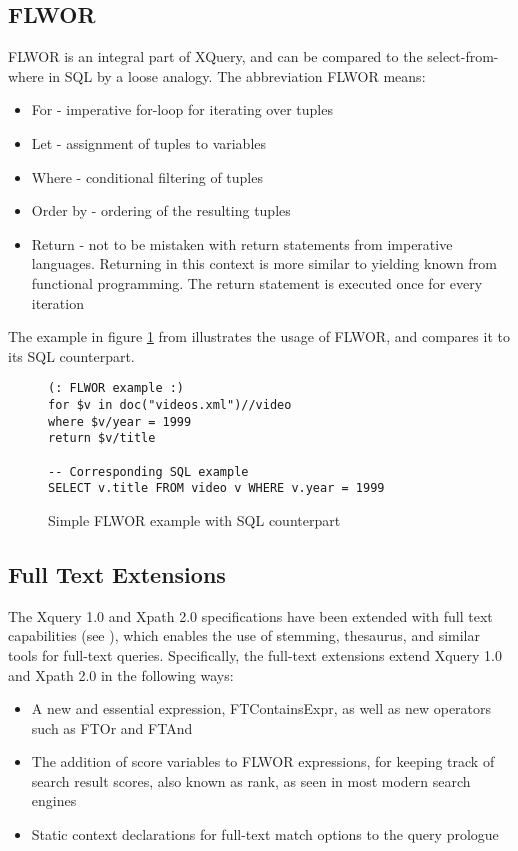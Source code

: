 \subsection{FLWOR}
FLWOR is an integral part of XQuery, and can be compared to the
select-from-where in SQL by a loose analogy. The abbreviation FLWOR means:
\begin{itemize}
\item For - imperative for-loop for iterating over tuples
\item Let - assignment of tuples to variables
\item Where - conditional filtering of tuples
\item Order by - ordering of the resulting tuples
\item Return - not to be mistaken with return statements from imperative
languages. Returning in this context is more similar to yielding known from
functional programming. The return statement is executed once for every
iteration   
\end{itemize}
The example in figure \ref{code:theory:flwor} from \cite{styl00} illustrates
the usage of FLWOR, and  compares it to its SQL counterpart.
\begin{figure}
\begin{Verbatim}
(: FLWOR example :)
for $v in doc("videos.xml")//video
where $v/year = 1999
return $v/title

-- Corresponding SQL example 
SELECT v.title FROM video v WHERE v.year = 1999
\end{Verbatim}
\caption[Simple FLWOR example]{Simple FLWOR example with SQL counterpart}
\label{code:theory:flwor}
\end{figure}

\subsection{Full Text Extensions}
The Xquery 1.0  and Xpath 2.0 specifications have been extended with full text
capabilities (see \cite{w3c02}), which enables the use of stemming, thesaurus,
and similar tools for full-text queries. Specifically, the full-text extensions
extend Xquery 1.0 and Xpath 2.0 in the following ways:
\begin{itemize}
\item A new and essential expression, FTContainsExpr, as well as new operators
such as FTOr and FTAnd 
\item The addition of score variables to FLWOR expressions, for keeping track
of search result scores, also known as rank, as seen in most modern search
engines 
\item Static context declarations for full-text match options to the query
prologue 
\end{itemize}

